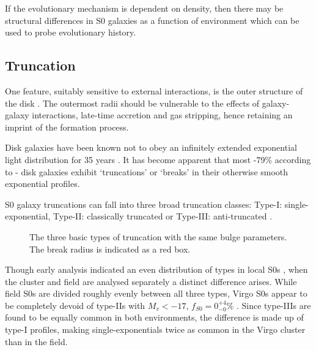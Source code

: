 If the evolutionary mechanism is dependent on density, then there may be structural differences in S0 galaxies as a function of environment which can be used to probe evolutionary history.

\subsection{Truncation}
One feature, suitably sensitive to external interactions, is the outer structure of the disk \citep{pohlen_stellar_2004}. The outermost radii should be vulnerable to the effects of galaxy-galaxy interactions, late-time accretion and gas stripping, hence retaining an imprint of the formation process. 

Disk galaxies have been known not to obey an infinitely extended exponential light distribution for 35 years \citep{van_der_kruit_optical_1979}. It has become apparent that most -79\% according to \citet{pohlen_cut-off_2001}- disk galaxies exhibit `truncations' or `breaks' in their otherwise smooth exponential profiles. 

S0 galaxy truncations can fall into three broad truncation classes: Type-I: single-exponential, Type-II: classically truncated \citep{freeman_disks_1970} or Type-III: anti-truncated \citep{erwin_antitruncation_2005}. 
\begin{figure}[h]
	\centering
	\caption{\footnotesize{\footnotesize{The three basic types of truncation with the same bulge parameters. The break radius is indicated as a red box.}}}
	\label{trunc_types}
\end{figure}

Though early analysis indicated an even distribution of types in local S0s \citep{gutierrez_outer_2011}, when the cluster and field are analysed separately a distinct difference arises. While field S0s are divided roughly evenly between all three types, Virgo S0s appear to be completely devoid of type-IIs with $M_v < -17$, $f_{S0} = 0_{-0}^{+4}\%$ \citep{erwin_strong_2012}. Since type-IIIs are found to be equally common in both environments, the difference is made up of type-I profiles, making single-exponentials twice as common in the Virgo cluster than in the field. 

